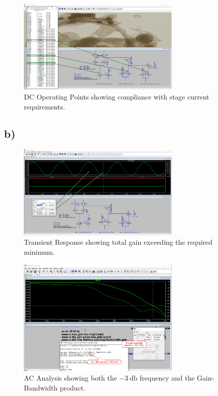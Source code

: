 \documentclass{article}
\begin{document}
	\begin{figure}[H]
	    \centering
	    \includegraphics[width=0.7\textwidth]{t1-op}
	    \caption{DC Operating Points showing compliance with stage current requirements.}
	\end{figure}
	
	\subsection*{b)}
	
	\begin{figure}[H]
	    \centering
	    \includegraphics[width=0.7\textwidth]{t1-trans}
	    \caption{Transient Response showing total gain exceeding the required minimum.}
	\end{figure}
	
	\begin{figure}[H]
	    \centering
	    \includegraphics[width=0.7\textwidth]{t1-ac}
	    \caption{AC Analysis showing both the $\SI{-3}{\decibel}$ frequency and the Gain-Bandwidth product.}
	\end{figure}
\end{document}
